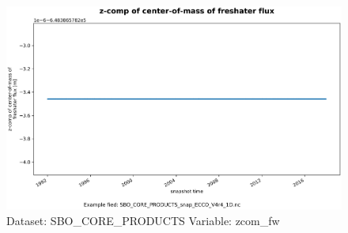 \begin{figure}[H]
\centering
\includegraphics[scale=0.55]{../images/plots/oneD_plots/SBO_Core_Products/zcom_fw.png}
\caption{Dataset: SBO\_CORE\_PRODUCTS Variable: zcom\_fw}
\label{tab:table-SBO_CORE_PRODUCTS_zcom_fw-Plot}
\end{figure}
\pagebreak
